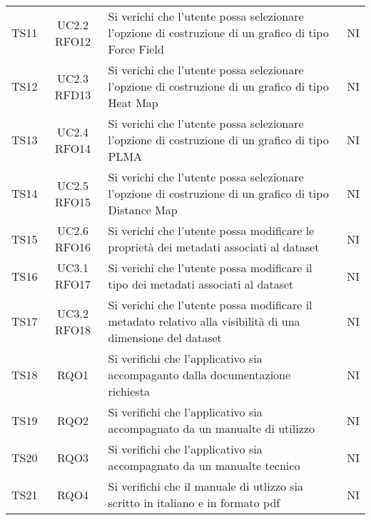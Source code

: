 \documentclass[../piano_di_qualifica.tex]{subfiles}
\begin{document}
\begin{center}
\begin{longtable}{|c|c|p{8cm}|c|}
		TS11              & UC2.2 RFO12            & Si verichi che l'utente possa selezionare l’opzione di costruzione di un grafico di tipo Force Field                   & NI                         \\
		TS12              & UC2.3 RFD13            & Si verichi che l'utente possa selezionare l’opzione di costruzione di un grafico di tipo Heat Map                      & NI                         \\
		TS13              & UC2.4 RFO14            & Si verichi che l'utente possa selezionare l’opzione di costruzione di un grafico di tipo PLMA                          & NI                         \\
		TS14              & UC2.5 RFO15            & Si verichi che l'utente possa selezionare l’opzione di costruzione di un grafico di tipo Distance Map                  & NI                         \\
		TS15              & UC2.6 RFO16            & Si verichi che l'utente possa modificare le proprietà dei metadati associati al dataset                                & NI                         \\
		TS16              & UC3.1 RFO17            & Si verichi che l'utente possa modificare il tipo dei metadati associati al dataset                                     & NI                         \\
		TS17              & UC3.2 RFO18            & Si verichi che l'utente possa modificare il metadato relativo alla visibilità di una dimensione del dataset            & NI                         \\
		TS18              & RQO1                   & Si verifichi che l'applicativo sia accompaganto dalla documentazione richiesta                                         & NI                         \\
		TS19              & RQO2                   & Si verifichi che l'applicativo sia accompagnato da un manualte di utilizzo                                             & NI                         \\
		TS20              & RQO3                   & Si verifichi che l'applicativo sia accompagnato da un manualte tecnico                                                 & NI                         \\
		TS21              & RQO4                   & Si verifichi che il manuale di utlizzo sia scritto in italiano e in formato pdf                                        & NI                         \\

\end{longtable}
\end{center}
\end{document}
